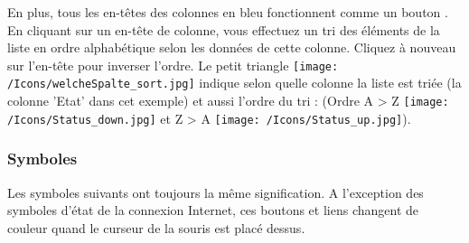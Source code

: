 En plus, tous les en-têtes des colonnes en bleu fonctionnent comme un bouton . En cliquant sur un en-tête de colonne, vous effectuez un tri des éléments de la liste en ordre alphabétique selon les données de cette colonne. Cliquez à nouveau sur l'en-tête pour inverser l'ordre. Le petit triangle \texttt{[image: /Icons/welcheSpalte\_sort.jpg]}  indique selon quelle colonne la liste est triée (la colonne 'Etat' dans cet exemple) et aussi l'ordre du tri : (Ordre A {\textgreater} Z \texttt{[image: /Icons/Status\_down.jpg]} et Z {\textgreater} A \texttt{[image: /Icons/Status\_up.jpg]}).

\pagebreak
\subsubsection{Symboles}
\label{bkm:Ref443039356}
Les symboles suivants ont toujours la même signification. A l'exception des symboles d'état de la connexion Internet, ces boutons et liens changent de couleur quand le curseur de la souris est placé dessus.

